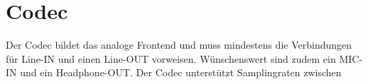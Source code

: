 \section{Codec}
\label{sec:Konzept_Codec}

Der Codec bildet das analoge Frontend und muss mindestens die Verbindungen für Line-IN und einen Line-OUT vorweisen.
Wünschenswert sind zudem ein MIC-IN und ein Headphone-OUT.
Der Codec unterstützt Samplingraten zwischen 

